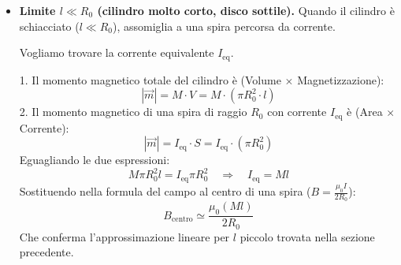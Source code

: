 \documentclass{book}
\begin{document}
\begin{itemize}
\textbf{Analisi dei casi limite:}
\begin{itemize}
    \item \textbf{Cilindro molto lungo (\(l \to \infty\)):}
    Il termine sotto radice è dominato da \(l^2\). La frazione tende a \(l/l = 1\).
    \[
    H_z \to -M(1-1) = 0 \quad \Longrightarrow \quad B_z \to \mu_0 M
    \]
    Questo è coerente col solenoide ideale infinito: il campo H interno è nullo e B è massimo.
    
    \item \textbf{Disco sottile (\(l \to 0\)):}
    La lunghezza \(l\) al numeratore va a zero, quindi \(B_z \to 0\). Ma guardiamo \(\vec{H}\):
    \[
    H_z \to -M(1 - 0) = -M
    \]
    In un disco piatto, il campo demagnetizzante è massimo e annulla quasi totalmente l'effetto della magnetizzazione materiale.
\end{itemize}

\textbf{5. Estensione a un punto generico \(z\) dell'asse}
Se ci spostiamo dal centro in un punto \(z\) generico (ma sempre dentro il cilindro, \(|z| < l/2\)):
\begin{itemize}
    \item La distanza dalla faccia positiva è \(d_1 = l/2 - z\).
    \item La distanza dalla faccia negativa è \(d_2 = l/2 + z\).
\end{itemize}
Sommando i contributi delle due facce come fatto per il centro, si ottiene la somma dei coseni degli angoli sottesi dalle facce:
\[
B_z(z)=\frac{\mu_0 M}{2}\left[\frac{l/2+z}{\sqrt{R_0^2+(l/2+z)^2}} + \frac{l/2-z}{\sqrt{R_0^2+(l/2-z)^2}}\right]
\]

\item \textbf{Limite \(l\ll R_0\) (cilindro molto corto, disco sottile).}  
Quando il cilindro è schiacciato (\(l \ll R_0\)), assomiglia a una spira percorsa da corrente.

Vogliamo trovare la corrente equivalente \(I_{\text{eq}}\).

1. Il momento magnetico totale del cilindro è (Volume \(\times\) Magnetizzazione):
\[
|\vec{m}| = M \cdot V = M \cdot (\pi R_0^2 \cdot l)
\]
2. Il momento magnetico di una spira di raggio \(R_0\) con corrente \(I_{\text{eq}}\) è (Area \(\times\) Corrente):
\[
|\vec{m}| = I_{\text{eq}} \cdot S = I_{\text{eq}} \cdot (\pi R_0^2)
\]
Eguagliando le due espressioni:
\[
M \pi R_0^2 l = I_{\text{eq}} \pi R_0^2 \quad \Longrightarrow \quad I_{\text{eq}} = M l
\]
Sostituendo nella formula del campo al centro di una spira (\(B = \frac{\mu_0 I}{2R_0}\)):
\[
B_{\text{centro}} \simeq \frac{\mu_0 (Ml)}{2R_0}
\]
Che conferma l'approssimazione lineare per \(l\) piccolo trovata nella sezione precedente.



\end{itemize}
\end{document}
